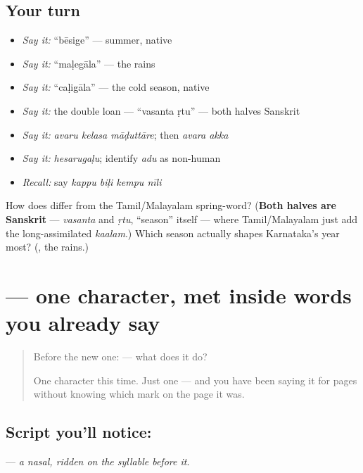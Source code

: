 \subsection*{Your turn}
\begin{itemize}
\raggedright
  \item \emph{Say it:} \textquotedblleft{}bēsige\textquotedblright{} — summer, native
  \item \emph{Say it:} \textquotedblleft{}maḷegāla\textquotedblright{} — the rains
  \item \emph{Say it:} \textquotedblleft{}caḷigāla\textquotedblright{} — the cold season, native
  \item \emph{Say it:} the double loan — \textquotedblleft{}vasanta ṛtu\textquotedblright{} — both halves Sanskrit
  \item \emph{Say it:} \emph{avaru kelasa māḍuttāre}; then \emph{avara akka}
  \item \emph{Say it:} \emph{hesarugaḷu}; identify \emph{adu} as non-human
  \item \emph{Recall:} say \emph{kappu biḷi kempu nīli}
\end{itemize}

\begin{tcolorbox}[breakable,colback=teal!4,colframe=teal!35!black,title={Before you move on}]
How does   differ from the Tamil/Malayalam spring-word? (\textbf{Both halves are Sanskrit} — \emph{vasanta} and \emph{ṛtu}, \textquotedblleft{}season\textquotedblright{} itself — where Tamil/Malayalam just add the long-assimilated \emph{kaalam}.) Which season actually shapes Karnataka's year most? (\textbf{}, the rains.)
\end{tcolorbox}
\section[\texorpdfstring{\kn{ಂ} (anusvara)}{ಂ (anusvara)}]{ — one character, met inside words you already say}

\label{lesson:KA-S123-sign-anusvara}



\begin{quote}
Before the new one:  — what does it do?

One character this time. Just one — and you have been saying it for pages without knowing which mark on the page it was.
\end{quote}

\subsection*{Script you'll notice: }
\textbf{} — \emph{a nasal, ridden on the syllable before it}.

